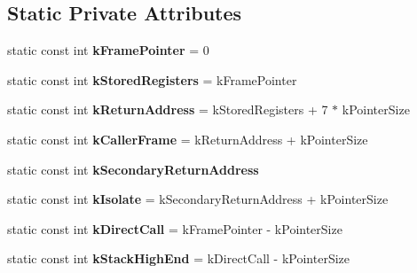 \subsection*{Static Private Attributes}
\begin{DoxyCompactItemize}
\item 
static const int {\bfseries k\+Frame\+Pointer} = 0\hypertarget{classv8_1_1internal_1_1_reg_exp_macro_assembler_p_p_c_a82216275b2f53c09ef32477a2937fce4}{}\label{classv8_1_1internal_1_1_reg_exp_macro_assembler_p_p_c_a82216275b2f53c09ef32477a2937fce4}

\item 
static const int {\bfseries k\+Stored\+Registers} = k\+Frame\+Pointer\hypertarget{classv8_1_1internal_1_1_reg_exp_macro_assembler_p_p_c_a7a6e32728ccb1a6b330463c9c8077f39}{}\label{classv8_1_1internal_1_1_reg_exp_macro_assembler_p_p_c_a7a6e32728ccb1a6b330463c9c8077f39}

\item 
static const int {\bfseries k\+Return\+Address} = k\+Stored\+Registers + 7 $\ast$ k\+Pointer\+Size\hypertarget{classv8_1_1internal_1_1_reg_exp_macro_assembler_p_p_c_a70762e387ee310b8918ee59a7bf6cd87}{}\label{classv8_1_1internal_1_1_reg_exp_macro_assembler_p_p_c_a70762e387ee310b8918ee59a7bf6cd87}

\item 
static const int {\bfseries k\+Caller\+Frame} = k\+Return\+Address + k\+Pointer\+Size\hypertarget{classv8_1_1internal_1_1_reg_exp_macro_assembler_p_p_c_afb534c35627b819dcbdf3b6edeba5deb}{}\label{classv8_1_1internal_1_1_reg_exp_macro_assembler_p_p_c_afb534c35627b819dcbdf3b6edeba5deb}

\item 
static const int {\bfseries k\+Secondary\+Return\+Address}
\item 
static const int {\bfseries k\+Isolate} = k\+Secondary\+Return\+Address + k\+Pointer\+Size\hypertarget{classv8_1_1internal_1_1_reg_exp_macro_assembler_p_p_c_ac0605e3486d0af5cacbbbc05b96ec297}{}\label{classv8_1_1internal_1_1_reg_exp_macro_assembler_p_p_c_ac0605e3486d0af5cacbbbc05b96ec297}

\item 
static const int {\bfseries k\+Direct\+Call} = k\+Frame\+Pointer -\/ k\+Pointer\+Size\hypertarget{classv8_1_1internal_1_1_reg_exp_macro_assembler_p_p_c_afba9e1340b39610d2ba9626dfe6dbbcb}{}\label{classv8_1_1internal_1_1_reg_exp_macro_assembler_p_p_c_afba9e1340b39610d2ba9626dfe6dbbcb}

\item 
static const int {\bfseries k\+Stack\+High\+End} = k\+Direct\+Call -\/ k\+Pointer\+Size\hypertarget{classv8_1_1internal_1_1_reg_exp_macro_assembler_p_p_c_a6eba9de90b2ed3ada1451292cb06b528}{}\label{classv8_1_1internal_1_1_reg_exp_macro_assembler_p_p_c_a6eba9de90b2ed3ada1451292cb06b528}


\end{DoxyCompactItemize}
